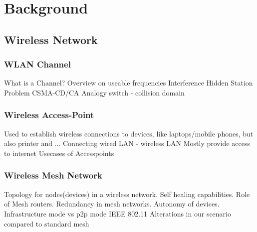 \chapter{Background}
\section{Wireless Network}
  \subsection{WLAN Channel}
    What is a Channel?\newline
    Overview on useable frequencies \newline
    Interference\newline
    Hidden Station Problem\newline
    CSMA-CD/CA\newline
    Analogy switch - collision domain \newline
  \subsection{Wireless Access-Point}
    Used to establish wireless connections to devices, like laptops/mobile phones, but also printer and ... 
    Connecting wired LAN - wireless LAN \newline
    Mostly provide access to internet\newline
    Usecases of Accesspoints\newline
  \subsection{Wireless Mesh Network}
    Topology for nodes(devices) in a wireless network.
    Self healing capabilities.
    Role of Mesh routers.
    Redundancy in mesh networks.
    Autonomy of devices.
    \cite{Akyildiz2005445}
    Infrastructure mode vs p2p mode
    IEEE 802.11
    \cite{airberry}
    Alterations in our scenario compared to standard mesh\newline
